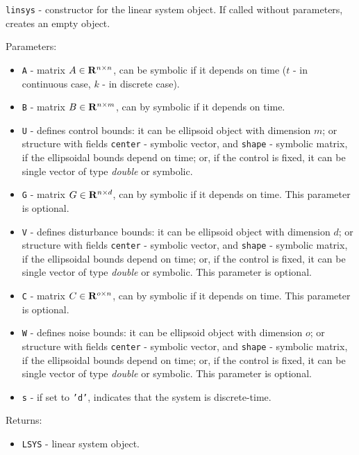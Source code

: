 \documentclass{report}
\begin{document}
\newpage

{\Large {\tt linsys}} - constructor for the linear system object.
If called without parameters, creates an empty object.

Parameters:
\begin{itemize}
\item {\tt A} - matrix $A\in{\bf R}^{n\times n}$, can be symbolic if it
depends on time ($t$ - in continuous case, $k$ - in discrete case).
\item {\tt B} - matrix $B\in{\bf R}^{n\times m}$, can by symbolic if it
depends on time.
\item {\tt U} - defines control bounds: it can be ellipsoid object with
dimension $m$; or structure with fields {\tt center} - symbolic vector,
and {\tt shape} - symbolic matrix, if the ellipsoidal bounds depend on time;
or, if the control is fixed, it can be single vector of type {\it double}
or symbolic.
\item {\tt G} - matrix $G\in{\bf R}^{n\times d}$, can by symbolic if it
depends on time. This parameter is optional.
\item {\tt V} - defines disturbance bounds: it can be ellipsoid object with
dimension $d$; or structure with fields {\tt center} - symbolic vector,
and {\tt shape} - symbolic matrix, if the ellipsoidal bounds depend on time;
or, if the control is fixed, it can be single vector of type {\it double}
or symbolic. This parameter is optional.
\item {\tt C} - matrix $C\in{\bf R}^{o\times n}$, can by symbolic if it
depends on time. This parameter is optional.
\item {\tt W} - defines noise bounds: it can be ellipsoid object with
dimension $o$; or structure with fields {\tt center} - symbolic vector,
and {\tt shape} - symbolic matrix, if the ellipsoidal bounds depend on time;
or, if the control is fixed, it can be single vector of type {\it double}
or symbolic. This parameter is optional.
\item {\tt s} - if set to {\tt 'd'}, indicates that the system is discrete-time.
\end{itemize}

Returns:
\begin{itemize}
\item {\tt LSYS} - linear system object.
\end{itemize}

\end{document}
